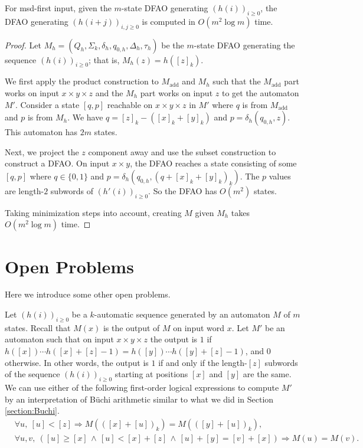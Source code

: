\documentclass[12pt,reqno]{article}
\def\AND{\, \wedge \,}
\def\add{\text{add}}
\begin{document}
\begin{theorem}
    For msd-first input, given the $m$-state DFAO generating $(h(i))_{i \geq 0}$, the DFAO generating $(h(i+j))_{i, j \geq 0}$ is computed in $O(m^2 \log m)$ time.
\end{theorem}
\begin{proof}
Let $M_h=(Q_h, \Sigma_k, \delta_h, q_{0,h}, \Delta_h, \tau_h)$ be the $m$-state DFAO generating the sequence $(h(i))_{i \geq 0}$; that is,  $M_h(z) = h([z]_k)$.

We first apply the product construction to $M_{\add}$ and $M_h$ such that the $M_\add$ part works on input $x\times y \times z$ and the $M_h$ part works on input $z$ to get the automaton $M'$. Consider a state $[q, p]$ reachable on $x \times y \times z$ in $M'$ where $q$ is from $M_{\add}$ and $p$ is from $M_h$. We have $q=[z]_k-([x]_k + [y]_k)$ and $p=\delta_h(q_{0, h}, z)$. This automaton has $2m$ states.


Next, we project the $z$ component away and use the subset construction to construct a DFAO.  On input $x \times y $, the DFAO reaches a state consisting of some $[q, p]$ where $q \in \{0, 1\}$ and $p = \delta_h(q_{0, h}, (q + [x]_k + [y]_k)_k)$. The $p$ values are length-$2$ subwords of $(h'(i))_{i \geq 0}$. So the DFAO has $O(m^2)$ states.


Taking minimization steps into account, creating $M$ given $M_h$ takes $O(m^2 \log m)$ time.
\end{proof}






\section{Open Problems} \label{section:open-problems}

Here we introduce some other open problems.

Let $(h(i))_{i \geq 0}$ be a $k$-automatic sequence generated by an automaton $M$ of $m$ states. Recall that $M(x)$ is the output of $M$ on input word $x$.
Let $M'$ be an automaton such that on input $x \times y \times z$ the output is $1$ if $h([x])\cdots h([x]+[z]-1) = h([y]) \cdots  h([y]+[z]-1)$, and $0$ otherwise. In other words, the output is $1$ if and only if the length-$[z]$ subwords of the sequence $(h(i))_{i \geq 0}$ starting at positions $[x]$ and $[y]$ are the same. 
We can use either of the following first-order logical expressions to compute $M'$ by an interpretation of B\"uchi arithmetic similar to what we did in Section \ref{section:Buchi}.
\begin{align*}
    &\forall u, \ [u] < [z] \Longrightarrow M(([x]+[u])_k) = M(([y]+[u])_k), \\
    &\forall u, v, \ ([u] \geq [x] \AND [u] < [x] + [z] \AND [u] + [y] = [v] + [x]) \Longrightarrow M(u) = M(v). 
\end{align*}
\end{document}
